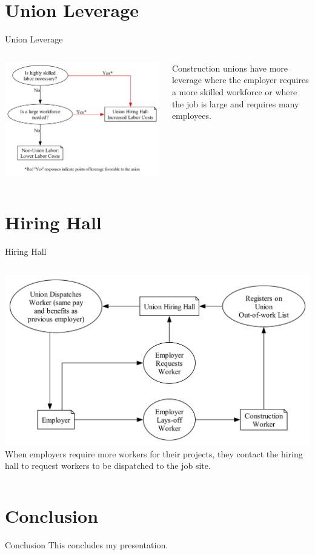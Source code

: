 \documentclass{beamer}
\begin{document}
\section{Union Leverage}
\begin{frame}{Union Leverage}
  \begin{columns}
    \includegraphics[width=\linewidth]{../images/union_power_red}

    Construction unions have more leverage where the employer requires a more skilled workforce or where the job is large and requires many employees.
  \end{columns}
\end{frame}

\section{Hiring Hall}
\begin{frame}{Hiring Hall}
	\begin{columns}
	\includegraphics[width=\linewidth]{../images/hiring_hall}
	When employers require more workers for their projects, they contact the hiring hall to request workers to be dispatched to the job site.
	\end{columns}
\end{frame}

\section{Conclusion}
\begin{frame}{Conclusion}
  This concludes my presentation.
\end{frame}
\end{document}
